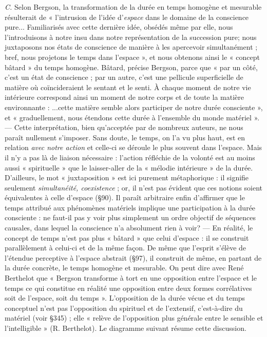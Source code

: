 {\it C.} Selon Bergson, la transformation de la durée en temps homogène
et mesurable résulterait de « l’intrusion de l’idée d’{\it espace} dans
le domaine de la conscience pure... Familiarisés avec cette dernière
idée, obsédés même par elle, nous l’introduisons à notre insu dans
notre représentation de la succession pure; nous juxtaposons nos
états de conscience de manière à les apercevoir simultanément ; bref,
nous projetons le temps dans l’espace », et nous obtenons ainsi le
« concept bâtard » du temps homogène. Bâtard, précise Bergson,
parce que « par un côté, c’est un état de conscience ; par un autre,
c’est une pellicule superficielle de matière où coïncideraient le sentant
et le senti. À chaque moment de notre vie intérieure correspond ainsi
un moment de notre corps et de toute la matière environnante :
...cette matière semble alors participer de notre durée consciente », et
« graduellement, nous étendons cette durée à l’ensemble du monde
matériel ». — Cette interprétation, bien qu’acceptée par de nombreux
auteurs, ne nous paraît nullement s’imposer. Sans doute, le temps,
on l’a vu plus haut, est en relation {\it avec notre action} et celle-ci se
déroule le plus souvent dans l’espace. Mais il n’y a pas là de liaison
nécessaire : l’action réfléchie de la volonté est au moins aussi « spirituelle »
que le laisser-aller de la « mélodie intérieure » de la durée.
D'ailleurs, le mot « juxtaposition » est ici purement métaphorique :
il signifie seulement {\it simultanéité, coexistence} ; or, il n’est pas évident
que ces notions soient équivalentes à celle d’espace (\S 90). Il paraît
arbitraire enfin d’affirmer que le temps attribué aux phénomènes
matériels implique une participation à la durée consciente : ne faut-il
pas y voir plus simplement un ordre objectif de séquences causales,
dans lequel la conscience n’a absolument rien à voir? — En réalité,
le concept de temps n’est pas plus « bâtard » que celui d’espace : il se
construit parallèlement à celui-ci et de la même façon. De même que
l'esprit s’élève de l’étendue perceptive à l’espace abstrait (\S 97), il
construit de même, en partant de la durée concrète, le temps homogène
et mesurable. On peut dire avec René Berthelot que « Bergson
transforme à tort en une opposition entre l’espace et le temps ce qui
constitue en réalité une opposition entre deux formes corrélatives
soit de l’espace, soit du temps ». L'opposition de la durée vécue et du
temps conceptuel n’est pas l’opposition du spirituel et de l’extensif,
c’est-à-dire du matériel (voir \S 345) ; elle « relève de l’opposition
plus générale entre le sensible et l’intelligible » (R. Berthelot). Le diagramme
suivant résume cette discussion.

